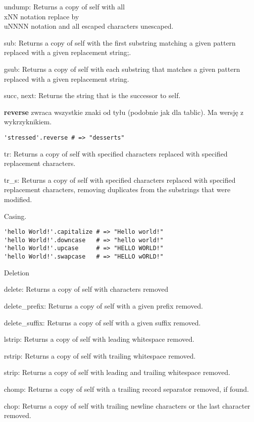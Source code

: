 undump: Returns a copy of self with all \\xNN notation replace by \\uNNNN notation and all escaped characters unescaped.

sub: Returns a copy of self with the first substring matching a given pattern replaced with a given replacement string;.

gsub: Returns a copy of self with each substring that matches a given pattern replaced with a given replacement string.

succ, next: Returns the string that is the successor to self.

\textbf{reverse} zwraca wszystkie znaki od tyłu (podobnie jak dla tablic).
Ma wersję z wykrzyknikiem.
\begin{verbatim}
'stressed'.reverse # => "desserts"
\end{verbatim}

tr: Returns a copy of self with specified characters replaced with specified replacement characters.

tr\_s: Returns a copy of self with specified characters replaced with specified replacement characters, removing duplicates from the substrings that were modified.


Casing.
\begin{verbatim}
'hello World!'.capitalize # => "Hello world!"
'hello World!'.downcase   # => "hello world!"
'hello World!'.upcase     # => "HELLO WORLD!"
'hello World!'.swapcase   # => "HELLO wORLD!"
\end{verbatim}

Deletion

delete: Returns a copy of self with characters removed

delete\_prefix: Returns a copy of self with a given prefix removed.

delete\_suffix: Returns a copy of self with a given suffix removed.

lstrip: Returns a copy of self with leading whitespace removed.

rstrip: Returns a copy of self with trailing whitespace removed.

strip: Returns a copy of self with leading and trailing whitespace removed.

chomp: Returns a copy of self with a trailing record separator removed, if found.

chop: Returns a copy of self with trailing newline characters or the last character removed.


